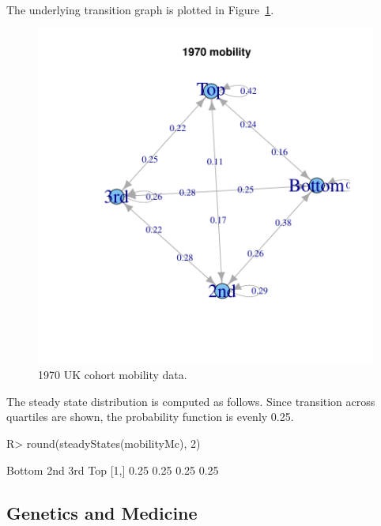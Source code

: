 \documentclass[nojss]{jss}
\begin{document}
The underlying transition graph is plotted in Figure~\ref{fig:mobility}.

\begin{figure}
\begin{center}
\includegraphics{an_introduction_to_markovchain_package-blandenEtAlii2}
\caption{1970 UK cohort mobility data.}
\label{fig:mobility}
\end{center}
\end{figure}

The steady state distribution is computed as follows. Since transition across
quartiles are shown, the probability function is evenly 0.25.

\begin{Schunk}
\begin{Sinput}
R> round(steadyStates(mobilityMc), 2)
\end{Sinput}
\begin{Soutput}
     Bottom  2nd  3rd  Top
[1,]   0.25 0.25 0.25 0.25
\end{Soutput}
\end{Schunk}

\subsection{Genetics and Medicine}\label{sec:gen}
\end{document}
